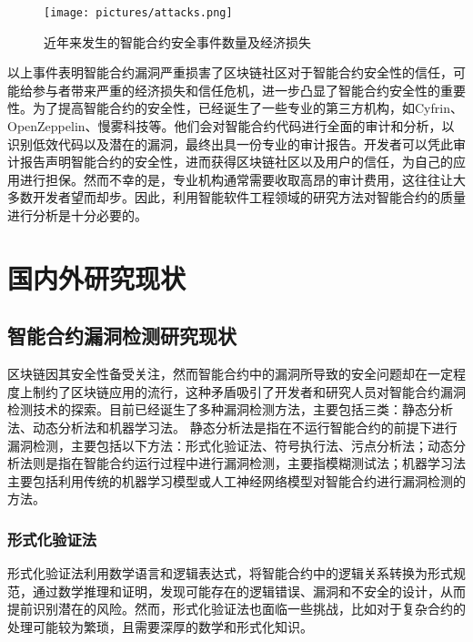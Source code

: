 \begin{figure}[htbp]
    \centering
    \texttt{[image: pictures/attacks.png]}
    \caption{\label{fig:attacks_events}近年来发生的智能合约安全事件数量及经济损失}
\end{figure}
    
以上事件表明智能合约漏洞严重损害了区块链社区对于智能合约安全性的信任，可能给参与者带来严重的经济损失和信任危机，进一步凸显了智能合约安全性的重要性。为了提高智能合约的安全性，已经诞生了一些专业的第三方机构，如Cyfrin、OpenZeppelin、慢雾科技等。他们会对智能合约代码进行全面的审计和分析，以识别低效代码以及潜在的漏洞，最终出具一份专业的审计报告。开发者可以凭此审计报告声明智能合约的安全性，进而获得区块链社区以及用户的信任，为自己的应用进行担保。然而不幸的是，专业机构通常需要收取高昂的审计费用，这往往让大多数开发者望而却步。因此，利用智能软件工程领域的研究方法对智能合约的质量进行分析是十分必要的。




\section{国内外研究现状}
\label{sec:国内外研究现状}
\subsection{智能合约漏洞检测研究现状}
\label{sec:智能合约漏洞检测研究现状}
区块链因其安全性备受关注，然而智能合约中的漏洞所导致的安全问题却在一定程度上制约了区块链应用的流行，这种矛盾吸引了开发者和研究人员对智能合约漏洞检测技术的探索。目前已经诞生了多种漏洞检测方法，主要包括三类：静态分析法、动态分析法和机器学习法。
静态分析法是指在不运行智能合约的前提下进行漏洞检测，主要包括以下方法：形式化验证法、符号执行法、污点分析法；动态分析法则是指在智能合约运行过程中进行漏洞检测，主要指模糊测试法；机器学习法主要包括利用传统的机器学习模型或人工神经网络模型对智能合约进行漏洞检测的方法。
\subsubsection{形式化验证法}
    
    形式化验证法利用数学语言和逻辑表达式，将智能合约中的逻辑关系转换为形式规范，通过数学推理和证明，发现可能存在的逻辑错误、漏洞和不安全的设计，从而提前识别潜在的风险。然而，形式化验证法也面临一些挑战，比如对于复杂合约的处理可能较为繁琐，且需要深厚的数学和形式化知识。
    
